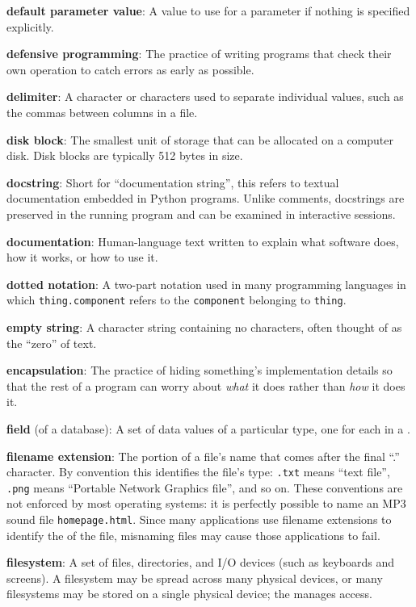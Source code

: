 \documentclass{book}
\begin{document}
\textbf{default parameter value}: A value to use for a parameter if
nothing is specified explicitly.

\textbf{defensive programming}: The practice of writing programs that
check their own operation to catch errors as early as possible.

\textbf{delimiter}: A character or characters used to separate
individual values, such as the commas between columns in a
 file.

\textbf{disk block}: The smallest unit of storage that can be allocated
on a computer disk. Disk blocks are typically 512 bytes in size.

\textbf{docstring}: Short for ``documentation string'', this refers to
textual documentation embedded in Python programs. Unlike comments,
docstrings are preserved in the running program and can be examined in
interactive sessions.

\textbf{documentation}: Human-language text written to explain what
software does, how it works, or how to use it.

\textbf{dotted notation}: A two-part notation used in many programming
languages in which \texttt{thing.component} refers to the
\texttt{component} belonging to \texttt{thing}.

\textbf{empty string}: A character string containing no characters,
often thought of as the ``zero'' of text.

\textbf{encapsulation}: The practice of hiding something's
implementation details so that the rest of a program can worry about
\emph{what} it does rather than \emph{how} it does it.

\textbf{field} (of a database): A set of data values of a particular
type, one for each  in a
.

\textbf{filename extension}: The portion of a file's name that comes
after the final ``.'' character. By convention this identifies the
file's type: \texttt{.txt} means ``text file'', \texttt{.png} means
``Portable Network Graphics file'', and so on. These conventions are not
enforced by most operating systems: it is perfectly possible to name an
MP3 sound file \texttt{homepage.html}. Since many applications use
filename extensions to identify the  of
the file, misnaming files may cause those applications to fail.

\textbf{filesystem}: A set of files, directories, and I/O devices (such
as keyboards and screens). A filesystem may be spread across many
physical devices, or many filesystems may be stored on a single physical
device; the  manages
access.
\end{document}
